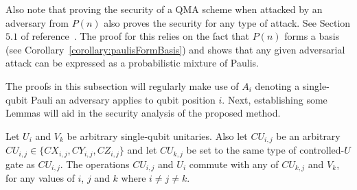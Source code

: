 Also note that proving the security of a QMA scheme when attacked by an adversary from $P(n)$ also proves the security for any type of attack. See Section $5.1$ of reference~\cite{broadbent2013quantum}. The proof for this relies on the fact that $P(n)$ forms a basis (see Corollary~\ref{corollary:paulisFormBasis}) and shows that any given adversarial attack can be expressed as a probabilistic mixture of Paulis.

The proofs in this subsection will regularly make use of $A_i$ denoting a single-qubit Pauli an adversary applies to qubit position $i$. Next, establishing some Lemmas will aid in the security analysis of the proposed method. 
\begin{myLemmarep}
\label{lemma:commutingEncryptionOperators}
Let $U_i$ and $V_k$ be arbitrary single-qubit unitaries. Also let $\mathit{CU}_{i,j}$ be an arbitrary $\mathit{CU}_{i,j} \in \{\mathit{CX}_{i,j}, \mathit{CY}_{i,j}, \mathit{CZ}_{i,j}\}$ and let $\mathit{CU}_{k,j}$ be set to the same type of controlled-$U$ gate as $\mathit{CU}_{i,j}$. The operations $\mathit{CU}_{i,j}$ and $U_i$ commute with any of $\mathit{CU}_{k,j}$ and $V_k$, for any values of $i$, $j$ and $k$ where $i \neq j \neq k$.
\end{myLemmarep}
